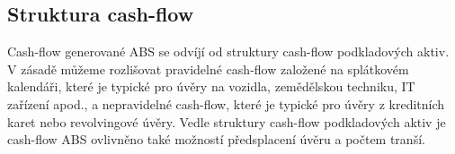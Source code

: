 \documentclass[a4paper]{book}
\begin{document}
\subsection{Struktura cash-flow}

Cash-flow generované ABS se odvíjí od struktury cash-flow podkladových aktiv. V zásadě můžeme rozlišovat pravidelné cash-flow založené na splátkovém kalendáři, které je typické pro úvěry na vozidla, zemědělskou techniku, IT zařízení apod., a nepravidelné cash-flow, které je typické pro úvěry z kreditních karet nebo revolvingové úvěry. Vedle struktury cash-flow podkladových aktiv je cash-flow ABS ovlivněno také možností předsplacení úvěru a počtem tranší.
\end{document}
